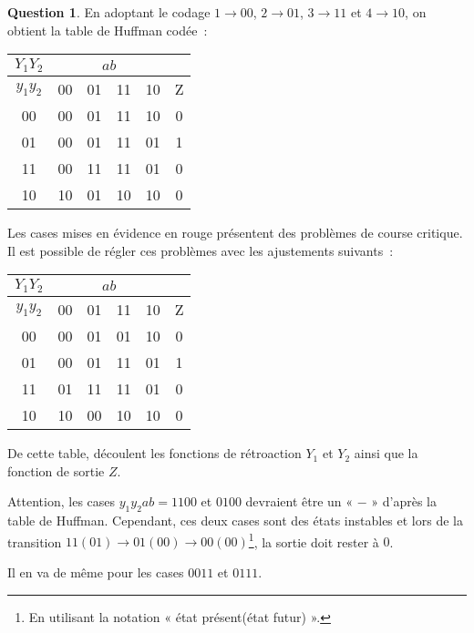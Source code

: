 \documentclass[11pt,a4paper]{article}
\theoremstyle{definition}%
\newtheorem{Q}{Question}[] %
\begin{document}
\begin{Q}
{		En adoptant le codage $1 \rightarrow 00$, $2 \rightarrow 01$, $3 \rightarrow 11$ et $4 \rightarrow 10$, on obtient la table de Huffman codée~:
		\begin{center}
			\begin{tabular}{|c|c|c|c|c|c|}\hline
			$Y_1Y_2$ & \multicolumn{4}{c|}{$ab$} & \\ \hline
			$y_1y_2$ & 00 & 01 & 11 & 10 & Z \\ \hline
			00 & 00 & 01 & {\color{red}11} & 10 & 0 \\ \hline
			01 & 00 & 01 & 11 & 01 & 1 \\ \hline
			11 & {\color{red}00} & 11 & 11 & 01 & 0 \\ \hline
			10 & 10  & {\color{red}01} & 10 & 10 & 0 \\ \hline
			\end{tabular}
		\end{center}

		Les cases mises en évidence en rouge présentent des problèmes de course critique.
		Il est possible de régler ces problèmes avec les ajustements suivants~:
		\begin{center}
			\begin{tabular}{|c|c|c|c|c|c|}\hline
			$Y_1Y_2$ & \multicolumn{4}{c|}{$ab$} & \\ \hline
			$y_1y_2$ & 00 & 01 & 11 & 10 & Z \\ \hline
			00 & 00 & 01 & {\color{green}01} & 10 & 0 \\ \hline
			01 & 00 & 01 & 11 & 01 & 1 \\ \hline
			11 & {\color{green}01} & 11 & 11 & 01 & 0 \\ \hline
			10 & 10  & {\color{green}00} & 10 & 10 & 0 \\ \hline
			\end{tabular}
		\end{center}

		De cette table, découlent les fonctions de rétroaction $Y_1$ et $Y_2$ ainsi que la fonction de sortie $Z$.

		\begin{center}
		\end{center}

		\begin{center}
		\end{center}

		\begin{center}
		\end{center}

		Attention, les cases $y_1y_2ab = 1100$ et $0100$ devraient être un « $-$ » d'après la table de Huffman.
		Cependant, ces deux cases sont des états instables et lors de la transition $11(01) \rightarrow 01(00) \rightarrow 00(00)$\footnote{En utilisant la notation « état présent(état futur) ».}, la sortie doit rester à $0$.

		Il en va de même pour les cases $0011$ et $0111$.


}
\end{Q}
\end{document}
